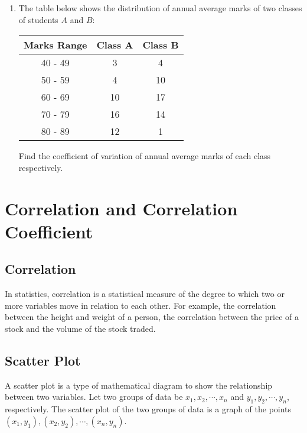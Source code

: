 \documentclass{report}
\begin{document}
\begin{multicols}{2}
\begin{enumerate}
    \item The table below shows the distribution of annual average marks of two classes
          of students $A$ and $B$:
          \begin{center}
            \begin{tabular}{|c|c|c|}
              \hline
              Marks Range & Class A & Class B \\
              \hline
              40 - 49     & 3       & 4       \\
              50 - 59     & 4       & 10      \\
              60 - 69     & 10      & 17      \\
              70 - 79     & 16      & 14      \\
              80 - 89     & 12      & 1       \\
              \hline
            \end{tabular}
          \end{center}
          Find the coefficient of variation of annual average marks of each class respectively.
  \end{enumerate}

  \section{Correlation and Correlation Coefficient}

  \subsection*{Correlation}

  In statistics, correlation is a statistical measure of the degree to which two
  or more variables move in relation to each other. For example, the correlation
  between the height and weight of a person, the correlation between the price of
  a stock and the volume of the stock traded.

  \subsection*{Scatter Plot}

  A scatter plot is a type of mathematical diagram to show the relationship
  between two variables. Let two groups of data be $x_1, x_2, \cdots, x_n$ and
  $y_1, y_2, \cdots, y_n$, respectively. The scatter plot of the two groups of
  data is a graph of the points $(x_1, y_1), (x_2, y_2), \cdots, (x_n, y_n)$.


\end{multicols}
\end{document}
